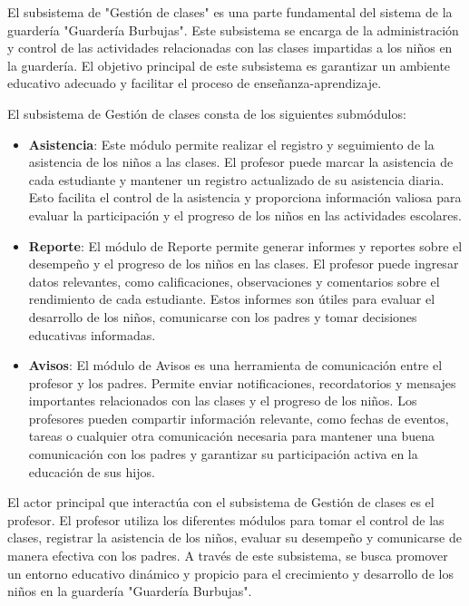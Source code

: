 El subsistema de "Gestión de clases" es una parte fundamental del sistema de la guardería "Guardería Burbujas". Este subsistema se encarga de la administración y control de las actividades relacionadas con las clases impartidas a los niños en la guardería. El objetivo principal de este subsistema es garantizar un ambiente educativo adecuado y facilitar el proceso de enseñanza-aprendizaje.

El subsistema de Gestión de clases consta de los siguientes submódulos:

\begin{itemize}
\item \textbf{Asistencia}: Este módulo permite realizar el registro y seguimiento de la asistencia de los niños a las clases. El profesor puede marcar la asistencia de cada estudiante y mantener un registro actualizado de su asistencia diaria. Esto facilita el control de la asistencia y proporciona información valiosa para evaluar la participación y el progreso de los niños en las actividades escolares.

\item \textbf{Reporte}: El módulo de Reporte permite generar informes y reportes sobre el desempeño y el progreso de los niños en las clases. El profesor puede ingresar datos relevantes, como calificaciones, observaciones y comentarios sobre el rendimiento de cada estudiante. Estos informes son útiles para evaluar el desarrollo de los niños, comunicarse con los padres y tomar decisiones educativas informadas.

\item \textbf{Avisos}: El módulo de Avisos es una herramienta de comunicación entre el profesor y los padres. Permite enviar notificaciones, recordatorios y mensajes importantes relacionados con las clases y el progreso de los niños. Los profesores pueden compartir información relevante, como fechas de eventos, tareas o cualquier otra comunicación necesaria para mantener una buena comunicación con los padres y garantizar su participación activa en la educación de sus hijos.

\end{itemize}

El actor principal que interactúa con el subsistema de Gestión de clases es el profesor. El profesor utiliza los diferentes módulos para tomar el control de las clases, registrar la asistencia de los niños, evaluar su desempeño y comunicarse de manera efectiva con los padres. A través de este subsistema, se busca promover un entorno educativo dinámico y propicio para el crecimiento y desarrollo de los niños en la guardería "Guardería Burbujas".


